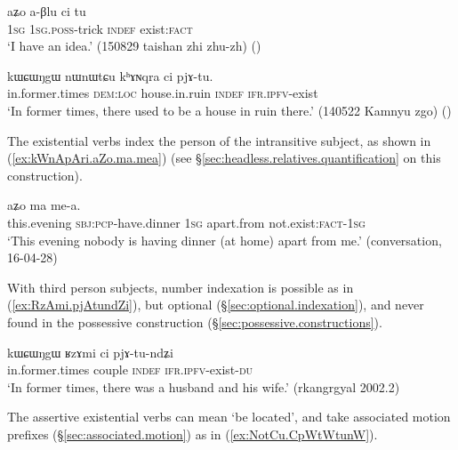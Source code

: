 \begin{exe}
\ex \label{ex:aBlu.ci.tu}
\gll   aʑo a-βlu ci tu \\
\textsc{1sg} \textsc{1sg}.\textsc{poss}-trick \textsc{indef} exist:\textsc{fact} \\
\glt `I have an idea.' (150829 taishan zhi zhu-zh)
()
\end{exe}

\begin{exe}
\ex \label{ex:khANqra.ci.pjAtu}
\gll   kɯɕɯŋgɯ nɯnɯtɕu kʰɤɴqra ci pjɤ-tu. \\
in.former.times \textsc{dem}:\textsc{loc} house.in.ruin \textsc{indef} \textsc{ifr}.\textsc{ipfv}-exist \\
\glt `In former times, there used to be a house in ruin there.' (140522 Kamnyu zgo)
()
\end{exe}

The existential verbs index the person of the intransitive subject, as shown in (\ref{ex:kWnApAri.aZo.ma.mea}) (see §\ref{sec:headless.relatives.quantification} on this construction).

\begin{exe}
\ex \label{ex:kWnApAri.aZo.ma.mea}
 aʑo ma me-a. \\
this.evening \textsc{sbj}:\textsc{pcp}-have.dinner \textsc{1sg} apart.from not.exist:\textsc{fact}-\textsc{1sg} \\
\glt `This evening nobody is having dinner (at home) apart from me.'   (conversation, 16-04-28)
\end{exe}

With third person subjects, number indexation is possible as in (\ref{ex:RzAmi.pjAtundZi}), but optional  (§\ref{sec:optional.indexation}), and never found in the possessive construction (§\ref{sec:possessive.constructions}).

\begin{exe}
\ex \label{ex:RzAmi.pjAtundZi}
\gll  kɯɕɯŋgɯ ʁzɤmi ci pjɤ-tu-ndʑi \\
in.former.times couple \textsc{indef} \textsc{ifr}.\textsc{ipfv}-exist-\textsc{du} \\
\glt `In former times, there was a husband and his wife.' (rkangrgyal 2002.2)
 \end{exe}
 
The assertive existential verbs can mean `be located', and take associated motion prefixes (§\ref{sec:associated.motion}) as in (\ref{ex:NotCu.CpWtWtunW}).

